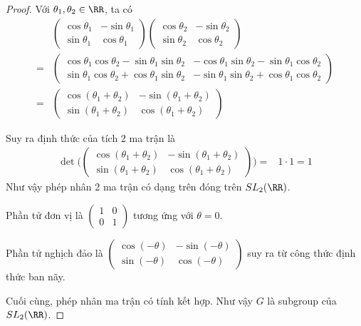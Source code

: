\begin{proof}
        Với $\theta_1, \theta_2 \in \RR$, ta có
        \begin{align*}
        & \begin{pmatrix}
            \cos \theta_1 & -\sin \theta_1 \\ \sin \theta_1 & \cos \theta_1
        \end{pmatrix} \begin{pmatrix}
            \cos \theta_2 & -\sin \theta_2 \\ \sin \theta_2 & \cos \theta_2
        \end{pmatrix} \\
        = & \begin{pmatrix}
            \cos \theta_1 \cos \theta_2 - \sin \theta_1 \sin \theta_2 & -\cos \theta_1 \sin \theta_2 - \sin \theta_1 \cos \theta_2 \\ 
            \sin \theta_1 \cos \theta_2 + \cos \theta_1 \sin \theta_2 & -\sin \theta_1 \sin \theta_2 + \cos \theta_1 \cos \theta_2
        \end{pmatrix} \\
        = & \begin{pmatrix}
            \cos (\theta_1 + \theta_2) & -\sin (\theta_1 + \theta_2) \\
            \sin (\theta_1 + \theta_2) & \cos (\theta_1 + \theta_2)
        \end{pmatrix}
        \end{align*}
        
        Suy ra định thức của tích 2 ma trận là
        \begin{align*}
            \det \Biggl(\begin{pmatrix}
                \cos (\theta_1 + \theta_2) & -\sin (\theta_1 + \theta_2) \\
                \sin (\theta_1 + \theta_2) & \cos (\theta_1 + \theta_2)
            \end{pmatrix}\Biggr)
            = & 1 \cdot 1 = 1
        \end{align*}
        Như vậy phép nhân 2 ma trận có dạng trên đóng trên $SL_2 (\RR)$.
        
        Phần tử đơn vị là $\begin{pmatrix}
        1 & 0 \\ 0 & 1
        \end{pmatrix}$ tương ứng với $\theta = 0$.
        
        Phần tử nghịch đảo là $\begin{pmatrix}
        \cos (-\theta) & -\sin (-\theta) \\ \sin (-\theta) & \cos (-\theta)
        \end{pmatrix}$ suy ra từ công thức định thức ban nãy.
        
        Cuối cùng, phép nhân ma trận có tính kết hợp. Như vậy $G$ là subgroup của $SL_2 (\RR)$.      
\end{proof}

